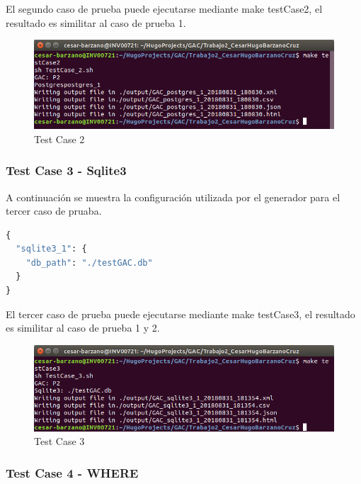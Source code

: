 \documentclass[a4paper,11pt]{book}
\begin{document}
El segundo caso de prueba puede ejecutarse mediante make testCase2, el resultado es similitar al caso de prueba 1. 

\begin{figure}[H]  
\centering 
\includegraphics[scale=0.35]{imagenes/TestCase2_1.png}
\caption{ Test Case 2 }  
\end{figure} 




\subsubsection{Test Case 3 - Sqlite3 }

A continuación se muestra la configuración utilizada por el generador para el tercer caso de pruaba. 

\begin{lstlisting}[language=python,caption={GAC\_GENERATOR\_CONFIG\_3.json }]
 {
  "sqlite3_1": {
    "db_path": "./testGAC.db"
  }
}

\end{lstlisting}


El tercer caso de prueba puede ejecutarse mediante make testCase3, el resultado es similitar al caso de prueba 1 y 2. 

\begin{figure}[H]  
\centering 
\includegraphics[scale=0.35]{imagenes/TestCase3_1.png}
\caption{ Test Case 3 }  
\end{figure} 


\subsubsection{Test Case 4 - WHERE}
\end{document}
